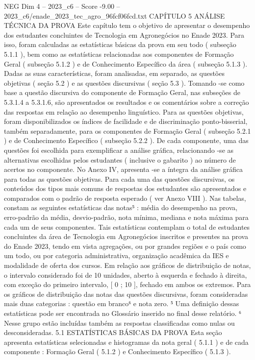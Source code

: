 \begin{textsample}{NEG Dim 4 – 2023\_c6 – Score -9.00 – 2023\_c6/enade\_2023\_tec\_agro\_96fcf06fcd.txt}  \label{ex:f4_neg_010}
CAPÍTULO 5 ANÁLISE TÉCNICA DA PROVA Este capítulo tem o objetivo de apresentar o desempenho dos estudantes concluintes de Tecnologia em Agronegócios no Enade 2023.
Para isso, foram calculadas as estatísticas básicas da prova em seu todo ( subseção 5.1.1 ), bem como as estatísticas relacionadas aos componentes de Formação Geral ( subseção 5.1.2 ) e de Conhecimento Específico da área ( subseção 5.1.3 ).
Dadas as suas características, foram analisadas, em separado, as questões objetivas ( seção 5.2 ) e as questões discursivas ( seção 5.3 ).
Tomando -se como base a questão discursiva do componente de Formação Geral, nas subseções de 5.3.1.4 a 5.3.1.6, são apresentados os resultados e os comentários sobre a correção das respostas em relação ao desempenho linguístico.
Para as questões objetivas, foram disponibilizados os índices de facilidade e de discriminação ponto-bisserial, também separadamente, para os componentes de Formação Geral ( subseção 5.2.1 ) e de Conhecimento Específico ( subseção 5.2.2 ).
De cada componente, uma das questões foi escolhida para exemplificar a análise gráfica, relacionando -se as alternativas escolhidas pelos estudantes ( inclusive o gabarito ) ao número de acertos no componente.
No Anexo IV, apresenta -se a íntegra da análise gráfica para todas as questões objetivas.
Para cada uma das questões discursivas, os conteúdos dos tipos mais comuns de respostas dos estudantes são apresentados e comparados com o padrão de resposta esperado ( ver Anexo VIII ).
Nas tabelas, constam as seguintes estatísticas das notas⁵ : média do desempenho na prova, erro-padrão da média, desvio-padrão, nota mínima, mediana e nota máxima para cada um de seus componentes.
Tais estatísticas contemplam o total de estudantes concluintes da área de Tecnologia em Agronegócios inscritos e presentes na prova do Enade 2023, tendo em vista agregações, ou por grandes regiões e o país como um todo, ou por categoria administrativa, organização acadêmica da IES e modalidade de oferta dos cursos.
Em relação aos gráficos de distribuição de notas, o intervalo considerado foi de 10 unidades, aberto à esquerda e fechado à direita, com exceção do primeiro intervalo, [ 0 ; 10 ], fechado em ambos os extremos.
Para os gráficos de distribuição das notas das questões discursivas, foram consideradas mais duas categorias : questão em branco⁶ e nota zero. ⁵ Uma definição dessas estatísticas pode ser encontrada no Glossário inserido no final desse relatório. ⁶ Nesse grupo estão incluídas também as respostas classificadas como nulas ou desconsideradas. 5.1 ESTATÍSTICAS BÁSICAS DA PROVA Esta seção apresenta estatísticas selecionadas e histogramas da nota geral ( 5.1.1 ) e de cada componente : Formação Geral ( 5.1.2 ) e Conhecimento Específico ( 5.1.3 ).

\end{textsample}
